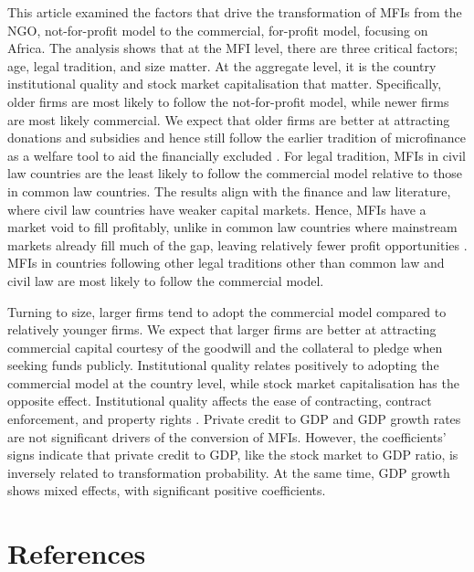 \documentclass[a4paper,nobind]{templates/ociamthesis}
\begin{document}
This article examined the factors that drive the transformation of MFIs from the NGO, not-for-profit model to the commercial, for-profit model, focusing on Africa. The analysis shows that at the MFI level, there are three critical factors; age, legal tradition, and size matter. At the aggregate level, it is the country institutional quality and stock market capitalisation that matter. Specifically, older firms are most likely to follow the not-for-profit model, while newer firms are most likely commercial. We expect that older firms are better at attracting donations and subsidies and hence still follow the earlier tradition of microfinance as a welfare tool to aid the financially excluded \autocite{d2017ngos}. For legal tradition, MFIs in civil law countries are the least likely to follow the commercial model relative to those in common law countries. The results align with the finance and law literature, where civil law countries have weaker capital markets. Hence, MFIs have a market void to fill profitably, unlike in common law countries where mainstream markets already fill much of the gap, leaving relatively fewer profit opportunities \autocite{la2013law,schnyder2018twenty}. MFIs in countries following other legal traditions other than common law and civil law are most likely to follow the commercial model.

Turning to size, larger firms tend to adopt the commercial model compared to relatively younger firms. We expect that larger firms are better at attracting commercial capital courtesy of the goodwill and the collateral to pledge when seeking funds publicly. Institutional quality relates positively to adopting the commercial model at the country level, while stock market capitalisation has the opposite effect. Institutional quality affects the ease of contracting, contract enforcement, and property rights \autocite{claessens2003financial}. Private credit to GDP and GDP growth rates are not significant drivers of the conversion of MFIs. However, the coefficients' signs indicate that private credit to GDP, like the stock market to GDP ratio, is inversely related to transformation probability. At the same time, GDP growth shows mixed effects, with significant positive coefficients.

\hypertarget{references}{%
\section{\texorpdfstring{\textbf{References}}{References}}\label{references}}
\end{document}
